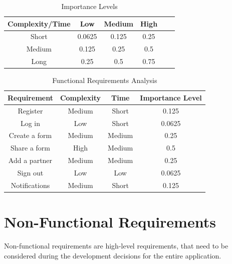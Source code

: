         \begin{table}[h]
            \centering
            \begin{tabular}{|c||c|c|c|c|c|}
                \hline
                Complexity/Time & Low & Medium & High\\
                \hline
                \hline
                Short & \cellcolor{green}0.0625 & \cellcolor{green}0.125 & \cellcolor{yellow}0.25\\
                \hline
                Medium & \cellcolor{green}0.125 & \cellcolor{yellow}0.25 & \cellcolor{red}0.5\\
                \hline
                Long & \cellcolor{yellow}0.25 & \cellcolor{red}0.5 & \cellcolor{red}0.75\\
                \hline
            \end{tabular}
            \caption{Importance Levels}
        \end{table}

        \begin{table}[h]
            \centering
            \begin{tabular}{|c|c|c|c|}
                \hline
                Requirement & Complexity & Time & Importance Level\\
                \hline
                \hline
                Register & Medium & Short & \cellcolor{green}0.125\\
                \hline
                Log in & Low & Short & \cellcolor{green}0.0625\\
                \hline
                Create a form & Medium & Medium & \cellcolor{yellow}0.25\\
                \hline
                Share a form & High & Medium & \cellcolor{red}0.5\\
                \hline
                Add a partner & Medium & Medium & \cellcolor{yellow}0.25\\
                \hline
                Sign out & Low & Low & \cellcolor{green}0.0625\\
                \hline
                Notifications & Medium & Short & \cellcolor{green}0.125\\
                \hline
            \end{tabular}
            \caption{Functional Requirements Analysis}
        \end{table}

\section{Non-Functional Requirements}
    Non-functional requirements are high-level requirements, that need to be considered during the development decisions for the entire application.\\

